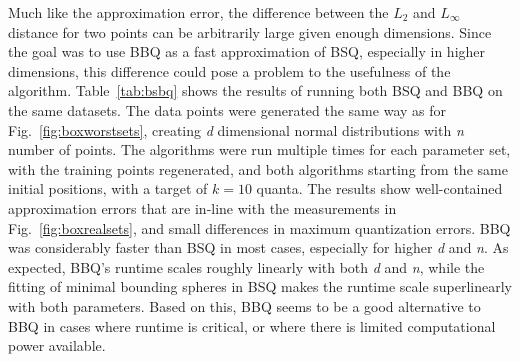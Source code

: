 			Much like the approximation error, the difference between the $L_2$ and $L_\infty$ distance for two points can be arbitrarily large given enough dimensions.
			Since the goal was to use \ac{BBQ} as a fast approximation of \ac{BSQ}, especially in higher dimensions, this difference could pose a problem to the usefulness of the algorithm.
			Table~\ref{tab:bsbq} shows the results of running both \ac{BSQ} and \ac{BBQ} on the same datasets.
			The data points were generated the same way as for Fig.~\ref{fig:boxworstsets}, creating \textit{d} dimensional normal distributions with \textit{n} number of points.
			The algorithms were run multiple times for each parameter set, with the training points regenerated, and both algorithms starting from the same initial positions, with a target of $k = 10$ quanta.
			The results show well-contained approximation errors that are in-line with the measurements in Fig.~\ref{fig:boxrealsets}, and small differences in maximum quantization errors.
			\ac{BBQ} was considerably faster than \ac{BSQ} in most cases, especially for higher \textit{d} and \textit{n}.
			As expected, \ac{BBQ}'s runtime scales roughly linearly with both \textit{d} and \textit{n}, while the fitting of minimal bounding spheres in \ac{BSQ} makes the runtime scale superlinearly with both parameters.
			Based on this, \ac{BBQ} seems to be a good alternative to \ac{BBQ} in cases where runtime is critical, or where there is limited computational power available.
			
